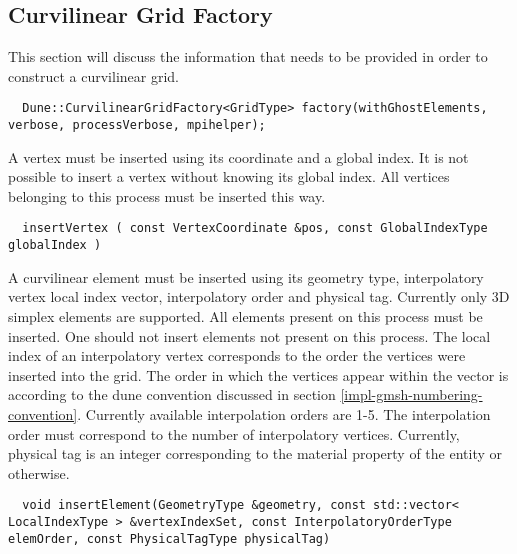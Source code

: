 \subsection{Curvilinear Grid Factory}
\label{interface-grid-factory}

This section will discuss the information that needs to be provided in order to construct a curvilinear grid. \\

\begin{mybox}
\begin{lstlisting}
  Dune::CurvilinearGridFactory<GridType> factory(withGhostElements, verbose, processVerbose, mpihelper);
\end{lstlisting}
\end{mybox}

\noindent
A vertex must be inserted using its coordinate and a global index. It is not possible to insert a vertex without knowing its global index. All vertices belonging to this process must be inserted this way. \\

\begin{mybox}
\begin{lstlisting}
  insertVertex ( const VertexCoordinate &pos, const GlobalIndexType globalIndex )
\end{lstlisting}
\end{mybox}

\noindent
A curvilinear element must be inserted using its geometry type, interpolatory vertex local index vector, interpolatory order and physical tag. Currently only 3D simplex elements are supported. All elements present on this process must be inserted. One should not insert elements not present on this process. The local index of an interpolatory vertex corresponds to the order the vertices were inserted into the grid. The order in which the vertices appear within the vector is according to the dune convention discussed in section \ref{impl-gmsh-numbering-convention}. Currently available interpolation orders are 1-5. The interpolation order must correspond to the number of interpolatory vertices. Currently, physical tag is an integer corresponding to the material property of the entity or otherwise.   \\

\begin{mybox}
\begin{lstlisting}
  void insertElement(GeometryType &geometry, const std::vector< LocalIndexType > &vertexIndexSet, const InterpolatoryOrderType elemOrder, const PhysicalTagType physicalTag)
\end{lstlisting}
\end{mybox}


